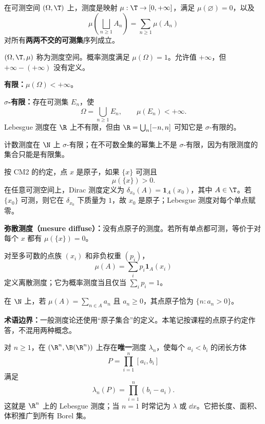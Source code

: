 在可测空间 $(\Omega,\T)$ 上，测度是映射 $\mu:\T\to[0,+\infty]$，满足 $\mu(\varnothing)=0$，以及
\[
\mu\!\left(\bigsqcup_{n\ge1}A_n\right)
=\sum_{n\ge1}\mu(A_n)
\]
对所有\textbf{两两不交的可测集}序列成立。

$(\Omega,\T,\mu)$ 称为测度空间。概率测度满足 $\mu(\Omega)=1$。允许值 $+\infty$，但 $+\infty-(+\infty)$ 没有定义。

\textbf{有限：}$\mu(\Omega)<+\infty$。

\textbf{$\sigma$-有限：}存在可测集 $E_n$，使
\[
\Omega=\bigcup_{n\ge1}E_n,\qquad\mu(E_n)<+\infty.
\]
Lebesgue 测度在 $\R$ 上不有限，但由 $\R=\bigcup_n[-n,n]$ 可知它是 $\sigma$-有限的。

计数测度在 $\N$ 上 $\sigma$-有限；在不可数全集的幂集上不是 $\sigma$-有限，因为有限测度的集合只能是有限集。

按 CM2 的约定，点 $x$ 是原子，如果 $\{x\}$ 可测且
\[
\mu(\{x\})>0.
\]
在任意可测空间上，Dirac 测度定义为 $\delta_{x_0}(A)=\mathbf1_A(x_0)$，其中 $A\in\T$。若 $\{x_0\}$ 可测，则它在 $\delta_{x_0}$ 下质量为 $1$，故 $x_0$ 是原子；Lebesgue 测度对每个单点赋零。

\textbf{弥散测度（mesure diffuse）：}没有点原子的测度。若所有单点都可测，等价于对每个 $x$ 都有 $\mu(\{x\})=0$。

对至多可数的点族 $(x_i)$ 和非负权重 $(p_i)$，
\[
\mu(A)=\sum_i p_i\mathbf1_A(x_i)
\]
定义离散测度；它为概率测度当且仅当 $\sum_i p_i=1$。

在 $\N$ 上，若 $\mu(A)=\sum_{n\in A}a_n$ 且 $a_n\ge0$，其点原子恰为 $\{n:a_n>0\}$。

\textbf{术语边界：}一般测度论还使用“原子集合”的定义。本笔记按课程的点原子约定作答，不混用两种概念。

对 $n\ge1$，在 $(\R^n,\B(\R^n))$ 上存在\textbf{唯一}测度 $\lambda_n$，使每个 $a_i<b_i$ 的闭长方体
\[
P=\prod_{i=1}^{n}[a_i,b_i]
\]
满足
\[
\lambda_n(P)=\prod_{i=1}^{n}(b_i-a_i).
\]
这就是 $\R^n$ 上的 Lebesgue 测度；当 $n=1$ 时常记为 $\lambda$ 或 $\dd x$。它把长度、面积、体积推广到所有 Borel 集。

